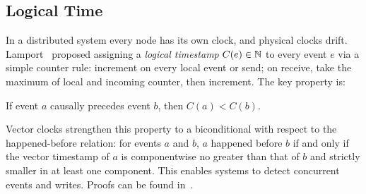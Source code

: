 \subsection{Logical Time}\label{subsec:logical-time}

In a distributed system every node has its own clock, and physical clocks drift. Lamport~\cite{lamport1978} proposed assigning a \emph{logical timestamp} $C(e)\in\mathbb{N}$ to every event $e$ via a simple counter rule: increment on every local event or send; on receive, take the maximum of local and incoming counter, then increment. The key property is:

\begin{smjproposition}\label{thm:lamport-clock}
If event $a$ causally precedes event $b$, then $C(a)<C(b)$.
\end{smjproposition}

Vector clocks strengthen this property to a biconditional with respect to the happened-before relation: for events $a$ and $b$, $a$ happened before $b$ if and only if the vector timestamp of $a$ is componentwise no greater than that of $b$ and strictly smaller in at least one component. This enables systems to detect concurrent events and writes. Proofs can be found in~\cite{lamport1978,fidge1988}.



